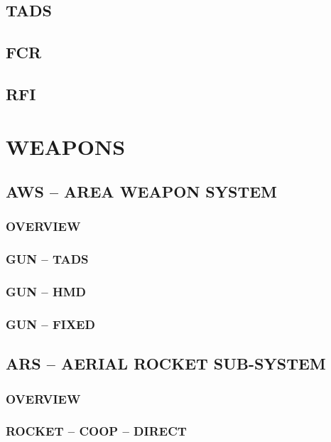 \documentclass[fontHelvetica]{TechCheck}
\begin{document}
	\clearpage

	\section{TADS}

	\clearpage

	\section{FCR}

	\clearpage 

	\section{RFI}

	\cleardoublepage

	\chapter{WEAPONS}
	\minitoc
	\cleardoublepage

	\section{AWS -- AREA WEAPON SYSTEM}
	\subsection{OVERVIEW}
	\subsection{GUN -- TADS}
	\subsection{GUN -- HMD} 
	\subsection{GUN -- FIXED}

	\clearpage 

	\section{ARS -- AERIAL ROCKET SUB-SYSTEM}
	\subsection{OVERVIEW}
	\subsection{ROCKET -- COOP -- DIRECT}
\end{document}

